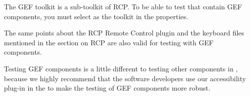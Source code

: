 The GEF toolkit is a sub-toolkit of RCP. To be able to test \gdauts{} that contain GEF components, you must select  as the toolkit in the \gdproject{} properties. 

The same points about the RCP Remote Control plugin and the keyboard files mentioned in the section on RCP \gdauts{}  are also valid for testing \gdauts{} with GEF components. 

Testing GEF components is a little different to testing other components in \app{}, because we highly recommend that the software developers use our accessibility plug-in in the \gdaut{} to make the testing of GEF components more robust. 
